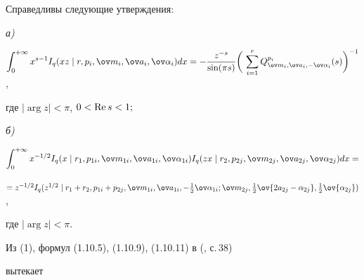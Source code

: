 \begin{thm} 


Справедливы следующие утверждения$:$ 


 


{\em а)} 


$\displaystyle{


\int^{+\infty}_0 x^{s-1}I_q(x z\mid 


r, p_i,\ov m_i,\ov a_i,\ov\alpha_i)dx=-\frac{z^{-s}}{\sin(\pi s)} 


\bigg(\,\sum^r_{i=1}Q^{p_i}_{\ov m_i,\ov a_i,-\ov\alpha_i}(s) 


\bigg)^{-1}}$, 





\noindent{}где $|\arg z|<\pi$, $0<\operatorname{Re} s<1;$ 


 


{\em б)} 


$\displaystyle{


\int^{+\infty}_0 x^{-1/2}I_q(x\mid 


r_1, p_{1i},\ov m_{1i},\ov a_{1i},\ov\alpha_{1i}) 


I_q(z x\mid r_2, p_{2j},\ov m_{2j},\ov a_{2j},\ov\alpha_{2j})dx=}$ 


 


\hfill $=z^{-1/2}I_q(z^{1/2}\mid r_1+r_2, p_{1i}+p_{2j}, 


\ov m_{1i},\ov a_{1i},-\tfrac{1}{2}\ov\alpha_{1i}; 


\ov m_{2j},\tfrac{1}{2}\ov{2a_{2j}-\alpha_{2j}}, 


\tfrac{1}{2}\ov{\alpha_{2j}})$, 





\noindent{}где $|\arg z|<\pi$. 


\end{thm} 


 


Из (1), формул (1.10.5), (1.10.9), (1.10.11) в (\cite{18}, с.\,38) 


вытекает 


 


